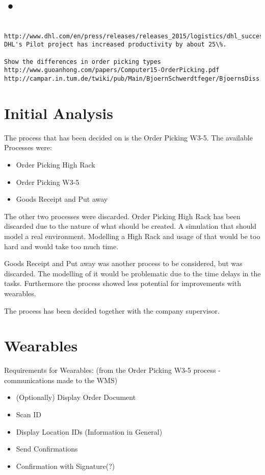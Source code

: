 \documentclass{report}
\begin{document}
\chapter{•}
\begin{verbatim}
 http://www.dhl.com/en/press/releases/releases_2015/logistics/dhl_successfully_tests_augmented_reality_application_in_warehouse.html
DHL's Pilot project has increased productivity by about 25\%.

Show the differences in order picking types
http://www.guoanhong.com/papers/Computer15-OrderPicking.pdf
http://campar.in.tum.de/twiki/pub/Main/BjoernSchwerdtfeger/BjoernsDiss.pdf

\end{verbatim}

\chapter{Initial Analysis}
The process that has been decided on is the Order Picking W3-5. The available Processes were:

\begin{itemize}
	\item Order Picking High Rack
	\item Order Picking W3-5
	\item Goods Receipt and Put away
\end{itemize}

The other two processes were discarded. Order Picking High Rack has been discarded due to the nature of what should be created. A simulation that should model a real environment. Modelling a High Rack and usage of that would be too hard and would take too much time.

Goods Receipt and Put away was another process to be considered, but was discarded. The modelling of it would be problematic due to the time delays in the tasks. Furthermore the process showed less potential for improvements with wearables.

The process has been decided together with the company supervisor.
\chapter{Wearables}
Requirements for Wearables: (from the Order Picking W3-5 process - communications made to the WMS)
\begin{itemize}
	\item (Optionally) Display Order Document
	\item Scan ID
	\item Display Location IDs (Information in General)
	\item Send Confirmations
	\item Confirmation with Signature(?)
\end{itemize}
\end{document}
